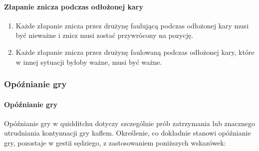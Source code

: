 \documentclass[12pt]{article}
\begin{document}
\paragraph{Złapanie znicza podczas odłożonej kary}

\begin{enumerate}
\item
    Każde złapanie znicza przez drużynę faulującą podczas odłożonej kary
  musi być nieważne i znicz musi zostać przywrócony na pozycję.
  \item
    Każde złapanie znicza przez drużynę faulowaną podczas odłożonej kary,
  które w innej sytuacji byłoby ważne, musi być ważne.
  \end{enumerate}

\subsubsection{Opóźnianie gry}

\paragraph{Opóźnianie gry}
Opóźnianie gry w quidditchu dotyczy
szczególnie prób zatrzymania lub znacznego utrudniania kontynuacji gry
kaflem. Określenie, co dokładnie stanowi opóźnianie gry, pozostaje w
gestii sędziego, z zastosowaniem poniższych wskazówek:
\end{document}
